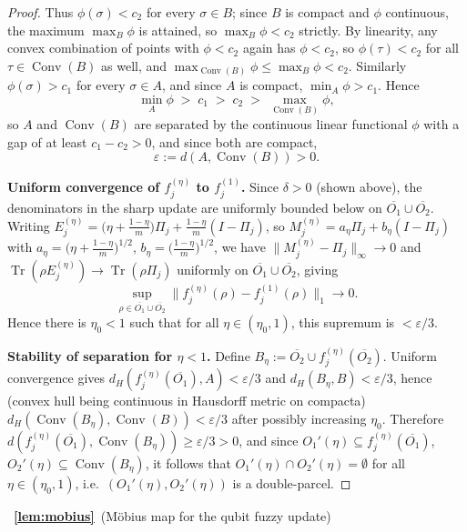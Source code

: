 \documentclass[11pt, onecolumn]{article}
\begin{document}
\begin{proof}
Thus $\phi(\sigma)<c_2$ for every $\sigma\in B$; since $B$ is compact and $\phi$ continuous, the maximum $\max_B\phi$ is attained, so $\max_B\phi<c_2$ strictly. By linearity, any convex combination of points with $\phi<c_2$ again has $\phi<c_2$, so $\phi(\tau)<c_2$ for all $\tau\in\operatorname{Conv}(B)$ as well, and $\max_{\operatorname{Conv}(B)}\phi\le\max_B\phi<c_2$. Similarly $\phi(\sigma)>c_1$ for every $\sigma\in A$, and since $A$ is compact, $\min_A\phi>c_1$. Hence
\[
\min_A\phi \;>\; c_1 \;>\; c_2 \;>\; \max_{\operatorname{Conv}(B)}\phi,
\]
so $A$ and $\operatorname{Conv}(B)$ are separated by the continuous linear functional $\phi$ with a gap of at least $c_1-c_2>0$, and since both are compact,
\[
\varepsilon:=d(A,\operatorname{Conv}(B))>0.
\]

\medskip
\noindent\textbf{Uniform convergence of $f_j^{(\eta)}$ to $f_j^{(1)}$.}
Since $\delta>0$ (shown above), the denominators in the sharp update are uniformly bounded below on $\overline{O_1}\cup\overline{O_2}$. Writing $E_j^{(\eta)}=\bigl(\eta+\frac{1-\eta}{m}\bigr)\Pi_j+\frac{1-\eta}{m}(I-\Pi_j)$, so $M_j^{(\eta)}=a_\eta\Pi_j+b_\eta(I-\Pi_j)$ with $a_\eta=\bigl(\eta+\frac{1-\eta}{m}\bigr)^{1/2}$, $b_\eta=\bigl(\frac{1-\eta}{m}\bigr)^{1/2}$, we have $\|M_j^{(\eta)}-\Pi_j\|_\infty\to0$ and $\operatorname{Tr}(\rho E_j^{(\eta)})\to\operatorname{Tr}(\rho\Pi_j)$ uniformly on $\overline{O_1}\cup\overline{O_2}$, giving
\[
\sup_{\rho\in\overline{O_1}\cup\overline{O_2}}\|f_j^{(\eta)}(\rho)-f_j^{(1)}(\rho)\|_1\longrightarrow0.
\]
Hence there is $\eta_0<1$ such that for all $\eta\in(\eta_0,1)$, this supremum is $<\varepsilon/3$.

\medskip
\noindent\textbf{Stability of separation for $\eta<1$.}
Define $B_\eta:=\overline{O_2}\cup f_j^{(\eta)}(\overline{O_2})$. Uniform convergence gives $d_H(f_j^{(\eta)}(\overline{O_1}),A)<\varepsilon/3$ and $d_H(B_\eta,B)<\varepsilon/3$, hence (convex hull being continuous in Hausdorff metric on compacta) $d_H(\operatorname{Conv}(B_\eta),\operatorname{Conv}(B))<\varepsilon/3$ after possibly increasing $\eta_0$. Therefore $d(f_j^{(\eta)}(\overline{O_1}),\operatorname{Conv}(B_\eta))\ge\varepsilon/3>0$, and since $O_1'(\eta)\subseteq f_j^{(\eta)}(\overline{O_1})$, $O_2'(\eta)\subseteq\operatorname{Conv}(B_\eta)$, it follows that $O_1'(\eta)\cap O_2'(\eta)=\emptyset$ for all $\eta\in(\eta_0,1)$, i.e.\ $(O_1'(\eta),O_2'(\eta))$ is a double-parcel.
\end{proof}

~{\bf \ref{lem:mobius}}~(M\"obius map for the qubit fuzzy update)
\end{document}
